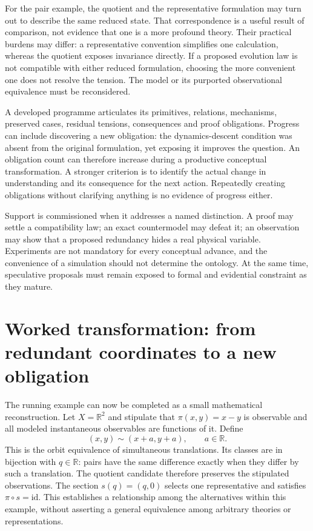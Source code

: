 For the pair example, the quotient and the representative formulation may turn
out to describe the same reduced state. That correspondence is a useful result
of comparison, not evidence that one is a more profound theory. Their practical
burdens may differ: a representative convention simplifies one calculation,
whereas the quotient exposes invariance directly. If a proposed evolution law is
not compatible with either reduced formulation, choosing the more convenient one
does not resolve the tension. The model or its purported observational equivalence
must be reconsidered.

A developed programme articulates its primitives, relations, mechanisms, preserved
cases, residual tensions, consequences and proof obligations. Progress can include
discovering a new obligation: the dynamics-descent condition was absent from the
original formulation, yet exposing it improves the question. An obligation count
can therefore increase during a productive conceptual transformation. A stronger
criterion is to identify the actual change in understanding and its consequence
for the next action. Repeatedly creating obligations without clarifying anything
is no evidence of progress either.

Support is commissioned when it addresses a named distinction. A proof may settle
a compatibility law; an exact countermodel may defeat it; an observation may show
that a proposed redundancy hides a real physical variable. Experiments are not
mandatory for every conceptual advance, and the convenience of a simulation
should not determine the ontology. At the same time, speculative proposals must
remain exposed to formal and evidential constraint as they mature.

\section{Worked transformation: from redundant coordinates to a new obligation}
\label{sec:conceptual-case}
The running example can now be completed as a small mathematical reconstruction.
Let $X=\mathbb{R}^2$ and stipulate that $\pi(x,y)=x-y$ is observable and all
modeled instantaneous observables are functions of it. Define
\[
 (x,y)\sim(x+a,y+a),\qquad a\in\mathbb{R}.
\]
This is the orbit equivalence of simultaneous translations. Its classes are in
bijection with $q\in\mathbb{R}$: pairs have the same difference exactly when they
differ by such a translation. The quotient candidate therefore preserves the
stipulated observations. The section $s(q)=(q,0)$ selects one representative and
satisfies $\pi\circ s=\mathrm{id}$. This establishes a relationship among the
alternatives within this example, without asserting a general equivalence among
arbitrary theories or representations.

